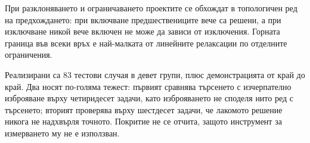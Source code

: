 При разклоняването и ограничаването проектите се обхождат в топологичен ред на
предхождането: при включване предшествениците вече са решени, а при изключване
никой вече включен не може да зависи от изключения. Горната граница във всеки връх
е най-малката от линейните релаксации по отделните ограничения.

Реализирани са 83 тестови случая в девет групи, плюс демонстрацията от край до
край. Два носят по-голяма тежест: първият сравнява търсенето с изчерпателно
изброяване върху четиридесет задачи, като изброяването не споделя нито ред с
търсенето; вторият проверява върху шестдесет задачи, че лакомото решение никога
не надхвърля точното. Покритие не се отчита, защото инструмент за измерването му
не е използван.
